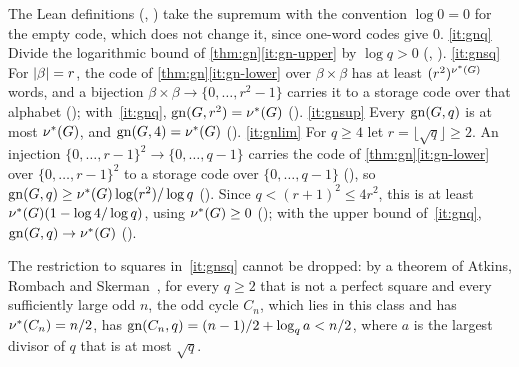 \begin{outline}
The Lean definitions (, ) take the supremum with the convention
$\log0=0$ for the empty code, which does not change it, since one-word codes give $0$. \ref{it:gnq} Divide the
logarithmic bound of \cref{thm:gn}\ref{it:gn-upper} by $\log q>0$ (,
). \ref{it:gnsq} For $\lvert \beta \rvert=r$, the code of \cref{thm:gn}\ref{it:gn-lower} over
$\beta\times\beta$ has at least $(r^2)^{\nu^{*}(G)}$ words, and a bijection $\beta\times\beta\to\{0,\dots,r^2-1\}$
carries it to a storage code over that alphabet (); with~\ref{it:gnq},
$\mathrm{gn}(G,r^2)=\nu^{*}(G)$ (). \ref{it:gnsup} Every $\mathrm{gn}(G,q)$ is at most $\nu^{*}(G)$, and
$\mathrm{gn}(G,4)=\nu^{*}(G)$ (). \ref{it:gnlim} For $q\ge4$ let $r=\lfloor\sqrt q\rfloor\ge2$. An
injection $\{0,\dots,r-1\}^2\to\{0,\dots,q-1\}$ carries the code of \cref{thm:gn}\ref{it:gn-lower} over
$\{0,\dots,r-1\}^2$ to a storage code over $\{0,\dots,q-1\}$ (), so
$\mathrm{gn}(G,q)\ge\nu^{*}(G)\log(r^2)/\log q$ (). Since $q<(r+1)^2\le4r^2$, this is at least
$\nu^{*}(G)(1-\log4/\log q)$, using $\nu^{*}(G)\ge0$ (); with the upper bound
of~\ref{it:gnq}, $\mathrm{gn}(G,q)\to\nu^{*}(G)$ ().
\end{outline}

The restriction to squares in~\ref{it:gnsq} cannot be dropped: by a theorem of Atkins, Rombach and
Skerman~\cite{AtkinsRombachSkerman2017}, for every $q\ge2$ that is not a perfect square and every sufficiently large odd
$n$, the odd cycle $C_n$, which lies in this class and has $\nu^{*}(C_n)=n/2$, has $\mathrm{gn}(C_n,q)=(n-1)/2+\log_qa<n/2$, where
$a$ is the largest divisor of $q$ that is at most $\sqrt q$.

